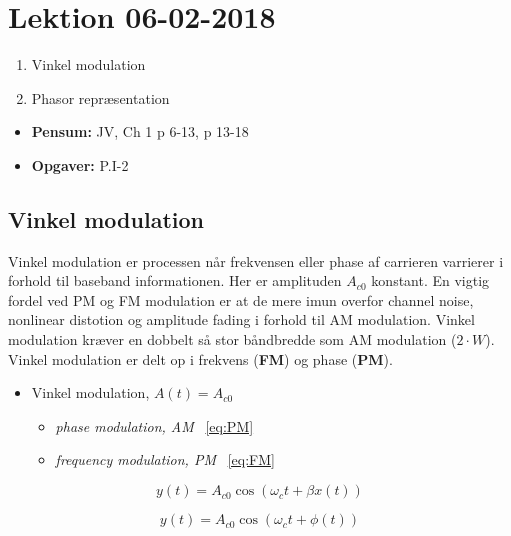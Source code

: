 \section{Lektion 06-02-2018}

\begin{enumerate}
	\item Vinkel modulation
	\item Phasor repræsentation
\end{enumerate}

\begin{mdframed}[style=exampledefault]
	\begin{itemize}
		\item \textbf{Pensum:} JV, Ch 1 p 6-13, p 13-18
		\item \textbf{Opgaver:} P.I-2
	\end{itemize}
\end{mdframed}

\subsection{Vinkel modulation}
Vinkel modulation er processen når frekvensen eller phase af carrieren varrierer i forhold til baseband informationen. Her er amplituden $A_{c0}$ konstant. En vigtig fordel ved PM og FM modulation er at de mere imun overfor channel noise, nonlinear distotion og amplitude fading i forhold til AM modulation. Vinkel modulation kræver en dobbelt så stor båndbredde som AM modulation ($2\cdot W$). \\

\noindent Vinkel modulation er delt op i frekvens (\textbf{FM}) og phase (\textbf{PM}).

\begin{itemize}
	\item Vinkel modulation, $A(t) = A_{c0}$
	\begin{itemize}
		\item \textit{phase modulation, AM} ~\ref{eq:PM}
		\item \textit{frequency modulation, PM} ~\ref{eq:FM}
	\end{itemize}
\end{itemize} 

\begin{equation}\label{eq:PM}
y(t) = A_{c0} \cos(\omega_c t + \beta x(t))
\end{equation}

\begin{equation}\label{eq:FM}
y(t) = A_{c0} \cos(\omega_c t + \phi(t))
\end{equation}


